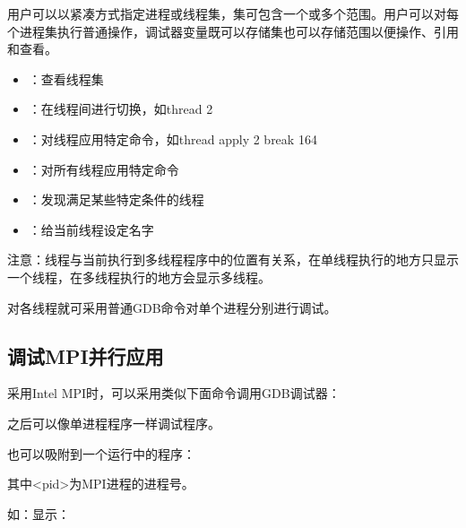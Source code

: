 \documentclass[a4paper,12pt,english]{sphinxmanual}
\begin{document}
\sphinxAtStartPar
用户可以以紧凑方式指定进程或线程集，集可包含一个或多个范围。用户可以对每个进程集执行普通操作，调试器变量既可以存储集也可以存储范围以便操作、引用和查看。
\begin{itemize}
\item {} 
\sphinxAtStartPar
{}：查看线程集

\item {} 
\sphinxAtStartPar
{}：在线程间进行切换，如thread 2

\item {} 
\sphinxAtStartPar
{}：对线程应用特定命令，如thread apply 2 break 164

\item {} 
\sphinxAtStartPar
{}：对所有线程应用特定命令

\item {} 
\sphinxAtStartPar
{}：发现满足某些特定条件的线程

\item {} 
\sphinxAtStartPar
{}：给当前线程设定名字

\end{itemize}

\sphinxAtStartPar
注意：线程与当前执行到多线程程序中的位置有关系，在单线程执行的地方只显示一个线程，在多线程执行的地方会显示多线程。

\sphinxAtStartPar
对各线程就可采用普通GDB命令对单个进程分别进行调试。


\subsection{调试MPI并行应用}
\label{\detokenize{debug/debug:mpi}}
\sphinxAtStartPar
采用Intel MPI时，可以采用类似下面命令调用GDB调试器：

\sphinxAtStartPar
{}

\sphinxAtStartPar
之后可以像单进程程序一样调试程序。

\sphinxAtStartPar
也可以吸附到一个运行中的程序：

\sphinxAtStartPar
{}

\sphinxAtStartPar
其中<pid>为MPI进程的进程号。

\sphinxAtStartPar
如：显示：
\end{document}
